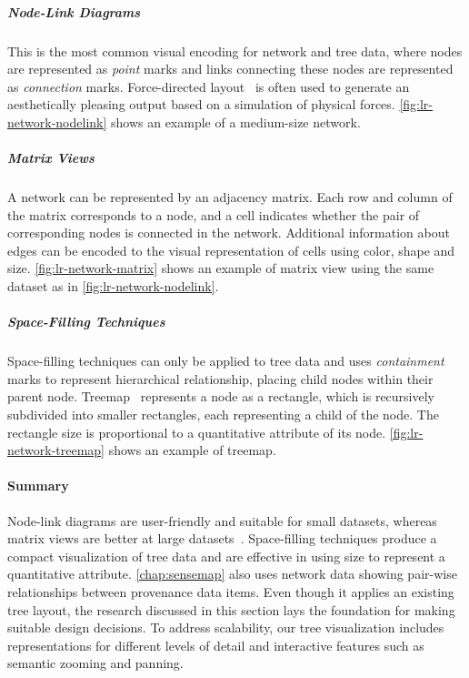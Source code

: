 \subparagraph{Node-Link Diagrams}
This is the most common visual encoding for network and tree data, where nodes are represented as \emph{point} marks and links connecting these nodes are represented as \emph{connection} marks. Force-directed layout~\cite{Eades1984} is often used to generate an aesthetically pleasing output based on a simulation of physical forces.  \autoref{fig:lr-network-nodelink} shows an example of a medium-size network.

\subparagraph{Matrix Views}
A network can be represented by an adjacency matrix. Each row and column of the matrix corresponds to a node, and a cell indicates whether the pair of corresponding nodes is connected in the network. Additional information about edges can be encoded to the visual representation of cells using color, shape and size. \autoref{fig:lr-network-matrix} shows an example of matrix view using the same dataset as in \autoref{fig:lr-network-nodelink}.

\subparagraph{Space-Filling Techniques}
Space-filling techniques can only be applied to tree data and uses \emph{containment} marks to represent hierarchical relationship, placing child nodes within their parent node. Treemap~\cite{Shneiderman1992} represents a node as a rectangle, which is recursively subdivided into smaller rectangles, each representing a child of the node. The rectangle size is proportional to a quantitative attribute of its node. \autoref{fig:lr-network-treemap} shows an example of treemap.

\paragraph{Summary}
Node-link diagrams are user-friendly and suitable for small datasets, whereas matrix views are better at large datasets~\cite{Ghoniem2005}. Space-filling techniques produce a compact visualization of tree data and are effective in using size to represent a quantitative attribute. \autoref{chap:sensemap} also uses network data showing pair-wise relationships between provenance data items. Even though it applies an existing tree layout, the research discussed in this section lays the foundation for making suitable design decisions. To address scalability, our tree visualization includes representations for different levels of detail and interactive features such as semantic zooming and panning.